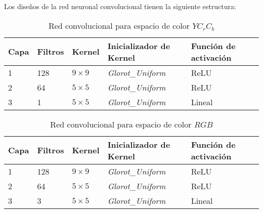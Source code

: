\begin{comment}
Para el caso del espacio de color $YC_rC_b$ realizamos el entrenamiento únicamente en el
canal $Y$, ya que es en este canal en donde se concentra la mayor parte de la información de la imagen referente a los detalles y
texturas (Si vemos este canal por separado, sería como ver la imagen en escala de grises). Para el caso del espacio de color $RGB$
el entrenamiento fue realizado sobre los 3 canales, ya que en este espacio de color, los detalles y texturas de la imagen se
distribuyen entre los 3 canales.\\
\end{comment}


Los diseños de la red neuronal convolucional tienen la siguiente estructura:
\begin{table}[H]
    \centering
    \caption{Red convolucional para espacio de color $YC_rC_b$}
    \begin{tabular}{|l|l|l|l|l|}
    \hline
    \textbf{Capa} & \textbf{Filtros} & \textbf{Kernel}  & \textbf{Inicializador de Kernel} & \textbf{Función de activación}\\ \hline
    1             & 128              & $9\times9$       & \emph{Glorot\_Uniform}           & ReLU                 \\
    2             & 64               & $5\times5$       & \emph{Glorot\_Uniform}           & ReLU                 \\
    3             & 1                & $5\times5$       & \emph{Glorot\_Uniform}           & Lineal               \\ \hline
    \end{tabular}
\end{table}

\begin{table}[H]
    \centering
    \caption{Red convolucional para espacio de color $RGB$}
    \begin{tabular}{|l|l|l|l|l|}
    \hline
    \textbf{Capa} & \textbf{Filtros} & \textbf{Kernel}  & \textbf{Inicializador de Kernel} & \textbf{Función de activación}\\ \hline
    1             & 128              & $9\times9$       & \emph{Glorot\_Uniform}           & ReLU                 \\
    2             & 64               & $5\times5$       & \emph{Glorot\_Uniform}           & ReLU                 \\
    3             & 3                & $5\times5$       & \emph{Glorot\_Uniform}           & Lineal               \\ \hline
    \end{tabular}
\end{table}

